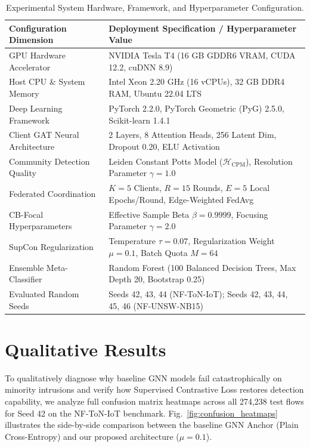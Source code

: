 \documentclass[12pt,a4paper]{report}
\begin{document}
\begin{table}[H]
\centering
\caption{Experimental System Hardware, Framework, and Hyperparameter Configuration.}
\label{tab:system_config}
\small
\begin{tabularx}{\textwidth}{l X}
\toprule
\textbf{Configuration Dimension} & \textbf{Deployment Specification / Hyperparameter Value} \\
\midrule
GPU Hardware Accelerator & NVIDIA Tesla T4 (16 GB GDDR6 VRAM, CUDA 12.2, cuDNN 8.9) \\
Host CPU \& System Memory & Intel Xeon 2.20 GHz (16 vCPUs), 32 GB DDR4 RAM, Ubuntu 22.04 LTS \\
Deep Learning Framework & PyTorch 2.2.0, PyTorch Geometric (PyG) 2.5.0, Scikit-learn 1.4.1 \\
Client GAT Neural Architecture & 2 Layers, 8 Attention Heads, 256 Latent Dim, Dropout 0.20, ELU Activation \\
Community Detection Quality & Leiden Constant Potts Model ($\mathcal{H}_{\text{CPM}}$), Resolution Parameter $\gamma = 1.0$ \\
Federated Coordination & $K = 5$ Clients, $R = 15$ Rounds, $E = 5$ Local Epochs/Round, Edge-Weighted FedAvg \\
CB-Focal Hyperparameters & Effective Sample Beta $\beta = 0.9999$, Focusing Parameter $\gamma = 2.0$ \\
SupCon Regularization & Temperature $\tau = 0.07$, Regularization Weight $\mu = 0.1$, Batch Quota $M = 64$ \\
Ensemble Meta-Classifier & Random Forest (100 Balanced Decision Trees, Max Depth 20, Bootstrap 0.25) \\
Evaluated Random Seeds & Seeds 42, 43, 44 (NF-ToN-IoT); Seeds 42, 43, 44, 45, 46 (NF-UNSW-NB15) \\
\bottomrule
\end{tabularx}
\end{table}

\section{Qualitative Results}\label{sec:qualitative}
\label{sec:qualitative_results}

To qualitatively diagnose why baseline GNN models fail catastrophically on minority intrusions and verify how Supervised Contrastive Loss restores detection capability, we analyze full confusion matrix heatmaps across all 274,238 test flows for Seed 42 on the NF-ToN-IoT benchmark. Fig.~\ref{fig:confusion_heatmaps} illustrates the side-by-side comparison between the baseline GNN Anchor (Plain Cross-Entropy) and our proposed architecture ($\mu = 0.1$).
\end{document}
